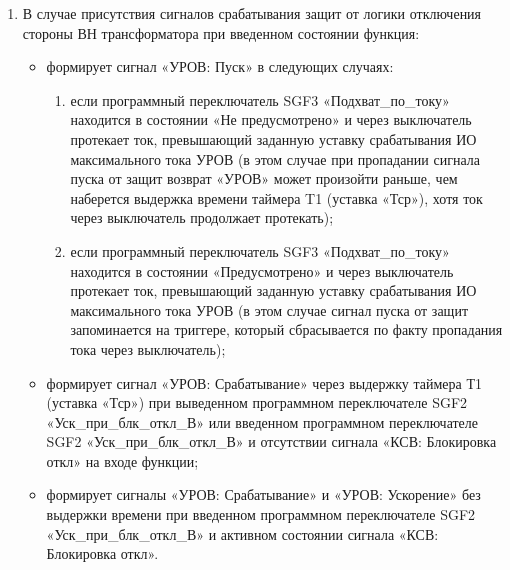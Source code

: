 \begin{enumerate}
\item\label{urov2:punkt}
В случае присутствия сигналов срабатывания защит от логики отключения стороны ВН трансформатора при введенном состоянии функция: 
\begin{itemize}
\item формирует сигнал «УРОВ: Пуск» в следующих случаях:
	\begin{enumerate}[label=\arabic*)]
	\sloppy
	\item если программный переключатель SGF3 «Подхват\_по\_току» находится в состоянии «Не предусмотрено» и через выключатель протекает ток, превышающий заданную уставку срабатывания ИО максимального тока УРОВ (в этом случае при пропадании сигнала пуска от защит возврат «УРОВ» может произойти раньше, чем наберется выдержка времени таймера T1 (уставка «Тср»), хотя ток через выключатель продолжает протекать); 
	\item если программный переключатель SGF3 «Подхват\_по\_току» находится в состоянии «Предусмотрено» и через выключатель протекает ток, превышающий заданную уставку срабатывания ИО максимального тока УРОВ (в этом случае сигнал пуска от защит запоминается на триггере, который сбрасывается по факту пропадания тока через выключатель);
	\end{enumerate}
\item формирует сигнал «УРОВ: Срабатывание» через выдержку таймера Т1 (уставка «Тср») при выведенном программном переключателе SGF2 «Уск\_при\_блк\_откл\_В» или введенном программном переключателе SGF2 «Уск\_при\_блк\_откл\_В» и отсутствии сигнала «КСВ: Блокировка откл» на входе функции;
\item формирует сигналы «УРОВ: Срабатывание» и «УРОВ: Ускорение» без выдержки времени при введенном программном переключателе SGF2 «Уск\_при\_блк\_откл\_В» и активном состоянии сигнала «КСВ: Блокировка откл».
\end{itemize}


\end{enumerate}
